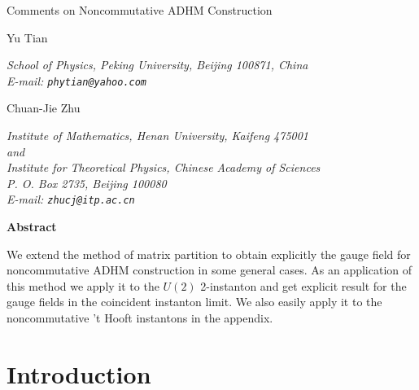 \documentclass[a4paper,a4paper]{article}
\begin{document}
\newcommand{\half}{\frac{1}{2}}

\thispagestyle{empty}

\begin{center}
 {\Large
    Comments on Noncommutative ADHM Construction
 }
\end{center}

\vspace*{2cm}
\begin{center}
 \noindent
 {\large Yu Tian}
 \vspace{5mm}
 \noindent
 \hspace{0.7cm} \parbox{120mm}{\it
School of Physics, Peking University, Beijing 100871, China
\\
E-mail: {\tt phytian@yahoo.com}
 }
\end{center}
 \vspace{5mm}
\begin{center}
 \noindent
 {\large Chuan-Jie Zhu}
 \vspace{5mm}
 \noindent
 \hspace{0.7cm} \parbox{120mm}{\it
Institute of Mathematics, Henan University, Kaifeng 475001
\\
and
\\
Institute for Theoretical Physics, Chinese Academy of Sciences
\\
P. O. Box 2735, Beijing 100080
\\
E-mail: {\tt zhucj@itp.ac.cn}
 }
\end{center}

\vspace{2cm}
\begin{center}
\bf{Abstract}
\end{center}
We extend the method of matrix partition to obtain explicitly the
gauge field for noncommutative ADHM construction in some general
cases. As an application of this method we apply it to the $U(2)$
2-instanton and get explicit result for the gauge fields in the
coincident instanton limit. We also easily apply it to the
noncommutative 't Hooft instantons in the appendix.

\newpage

\section{Introduction}
\end{document}
